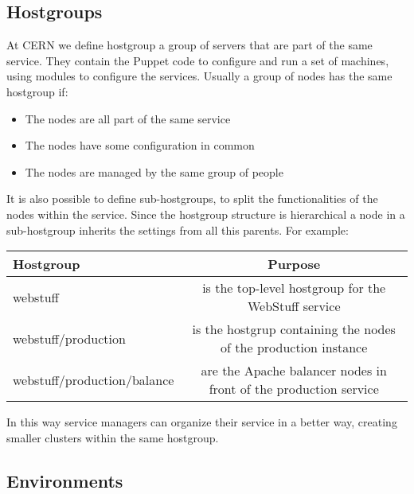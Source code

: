 \subsection{Hostgroups}

At CERN we define hostgroup a group of servers that are part of the same
service. They contain the Puppet code to configure and run a set of
machines, using modules to configure the services. Usually a group of
nodes has the same hostgroup if:

\begin{itemize}

\item The nodes are all part of the same service

\item The nodes have some configuration in common

\item The nodes are managed by the same group of people

\end{itemize}

It is also possible to define sub-hostgroups, to split the functionalities
of the nodes within the service. Since the hostgroup structure is
hierarchical a node in a sub-hostgroup inherits the settings from all this
parents. For example: 

\begin{table}[H]
    \begin{center}
    \begin{tabular}{|l|c|}
        \hline
        \textbf{Hostgroup} & \textbf{Purpose} \\
        \hline
        webstuff & is the top-level hostgroup for the WebStuff service \\
        \hline
        webstuff/production & is the hostgrup containing the nodes of the production instance \\
        \hline
        webstuff/production/balance & are the Apache balancer nodes in front of the production service \\
        \hline
    \end{tabular}
    \end{center}
\end{table}

In this way service managers can organize their service in a better way,
creating smaller clusters within the same hostgroup.

\subsection{Environments}

